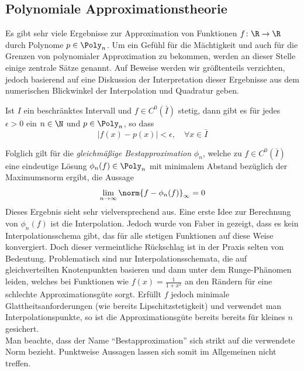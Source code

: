 \subsection{Polynomiale Approximationstheorie}
\label{sec:poly_approx}
Es gibt sehr viele Ergebnisse zur Approximation von Funktionen $f\colon \R\to\R$ durch Polynome $p\in\Poly_n$. Um ein Gefühl für die Mächtigkeit und auch für die Grenzen von polynomialer Approximation zu bekommen, werden an dieser Stelle einige zentrale Sätze genannt. Auf Beweise werden wir größtenteils verzichten, jedoch basierend auf \autocite{Trefethen} eine Diskussion der Interpretation dieser Ergebnisse aus dem numerischen Blickwinkel der Interpolation und Quadratur geben.
\begin{maththeorem}[Weierstrass]
Ist $I$ ein beschränktes Intervall und $f\in C^0(\bar{I})$ stetig, dann gibt es für jedes $\epsilon >0$ ein $n\in\N$ und $p\in\Poly_n$, so dass
\[|f(x)-p(x)|<\epsilon,\quad \forall x\in\bar{I}\]
\end{maththeorem}
Folglich gilt für die \emph{gleichmäßige Bestapproximation} $\phi_n$, welche zu $f\in C^0(\bar{I})$ eine eindeutige Lösung $\phi_n(f)\in\Poly_n$ mit minimalem Abstand bezüglich der Maximumsnorm ergibt, die Aussage
\[\lim\limits_{n\to\infty}\norm{f-\phi_n(f)}_\infty=0\] 
Dieses Ergebnis sieht sehr vielversprechend aus. Eine erste Idee zur Berechnung von $\phi_n(f)$ ist die Interpolation. Jedoch wurde von Faber in \autocite{faber14} gezeigt, dass es kein Interpolationsschema gibt, das für alle stetigen Funktionen auf diese Weise konvergiert. Doch dieser vermeintliche Rückschlag ist in der Praxis selten von Bedeutung. Problematisch sind nur Interpolationsschemata, die auf gleichverteilten Knotenpunkten basieren und dann unter dem Runge-Phänomen leiden, welches bei Funktionen wie $f(x)=\frac{1}{1+x^2}$ an den Rändern für eine schlechte Approximationsgüte sorgt. Erfüllt $f$ jedoch minimale Glattheitsanforderungen (wie bereits Lipschitzstetigkeit) und verwendet man \chebyspace Interpolationspunkte, so ist die Approximationsgüte bereits bereits für kleines $n$ gesichert.\\
Man beachte, dass der Name "`Bestapproximation"' sich strikt auf die verwendete Norm bezieht. Punktweise Aussagen lassen sich somit im Allgemeinen nicht treffen. 
